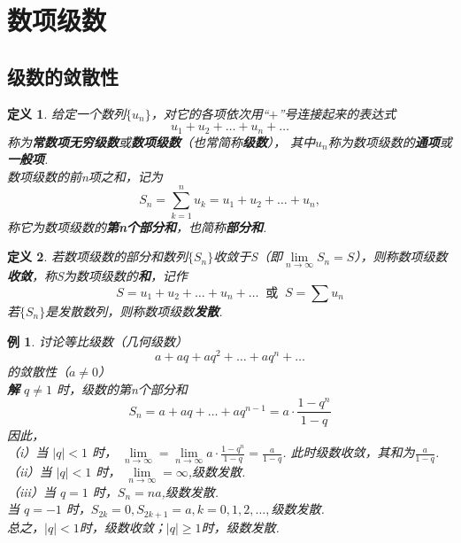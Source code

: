 \documentclass[12pt, UTF8, AutoFakeBold]{ctexart} %
\newtheorem{definition}{定义}[section]
\newtheorem{example}{例}[section]
\begin{document}
\tableofcontents %

\section{数项级数}
\subsection{级数的敛散性}

\begin{definition}
    给定一个数列$\{u_n\}$，对它的各项依次用“$+$”号连接起来的表达式
    \[
        u_1 + u_2 + \dots + u_n + \dots
    \]
    称为\textbf{\kaishu 常数项无穷级数}或\textbf{\kaishu 数项级数}（也常简称\textbf{\kaishu 级数}），
    其中$u_n$称为数项级数的\textbf{\kaishu 通项}或\textbf{\kaishu 一般项}.\\
    数项级数的前n项之和，记为
    \[
        S_n = \sum_{k=1}^{n}u_k = u_1 + u_2 + \dots + u_n,
    \]
    称它为数项级数的\textbf{\kaishu 第n个部分和}，也简称\textbf{\kaishu 部分和}.
\end{definition}

\begin{definition}
    若数项级数的部分和数列$\{S_n\}$收敛于S（即$\lim\limits_{n \to \infty}S_n = S$），则称数项级数\textbf{\kaishu 收敛}，称S为数项级数的\textbf{\kaishu 和}，记作
    \[
        S = u_1 + u_2 + \dots + u_n + \dots \;\; \text{或} \;\; S = \sum u_n
    \]
    若$\{S_n\}$是发散数列，则称数项级数\textbf{\kaishu 发散}.
\end{definition}

\begin{example}
    讨论等比级数（几何级数）
    \[
        a + aq + aq^2 + \dots + aq^n + \dots
    \]
    的敛散性（$a \neq 0$）\\
    \textbf{解} $q \neq 1$ 时，级数的第n个部分和
    \[
        S_n = a + aq + \dots + aq^{n-1} = a \cdot \frac{1 - q^n}{1 - q} 
    \]
    因此，\\
    \indent （i）当 $\lvert q \rvert < 1$ 时，
    $\lim\limits_{n \to \infty} = \lim\limits_{n \to \infty} a \cdot \frac{1 - q^n}{1 - q} = \frac{a}{1 - q}$. 
    此时级数收敛，其和为$\frac{a}{1 - q}$.\\
    \indent （ii）当 $\left\lvert q \right\rvert < 1$ 时，
    $\lim\limits_{n \to \infty} = \infty$,级数发散.\\
    \indent （iii）当 $q = 1$ 时，$S_n = na$,级数发散.\\
    \indent 当 $q = -1$ 时，$S_{2k} = 0, S_{2k+1} = a, k = 0, 1, 2, \dots,$级数发散.\\
    \indent 总之，$\lvert q \rvert < 1$时，级数收敛；$\lvert q \rvert \geqslant 1$时，级数发散.
\end{example}
\end{document}
